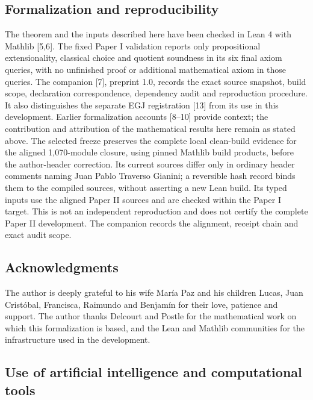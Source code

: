 \documentclass[english,11pt,a4paper]{article}
\begin{document}
\subsection{Formalization and reproducibility}\label{formalization-and-reproducibility}

The theorem and the inputs described here have been checked in Lean 4 with Mathlib {[}5,6{]}. The fixed Paper I validation reports only propositional extensionality, classical choice and quotient soundness in its six final axiom queries, with no unfinished proof or additional mathematical axiom in those queries. The companion {[}7{]}, preprint 1.0, records the exact source snapshot, build scope, declaration correspondence, dependency audit and reproduction procedure. It also distinguishes the separate EGJ registration {[}13{]} from its use in this development. Earlier formalization accounts {[}8--10{]} provide context; the contribution and attribution of the mathematical results here remain as stated above. The selected freeze preserves the complete local clean-build evidence for the aligned 1,070-module closure, using pinned Mathlib build products, before the author-header correction. Its current sources differ only in ordinary header comments naming Juan Pablo Traverso Gianini; a reversible hash record binds them to the compiled sources, without asserting a new Lean build. Its typed inputs use the aligned Paper II sources and are checked within the Paper I target. This is not an independent reproduction and does not certify the complete Paper II development. The companion records the alignment, receipt chain and exact audit scope.

\subsection{Acknowledgments}\label{acknowledgments}

The author is deeply grateful to his wife María Paz and his children Lucas, Juan Cristóbal, Francisca, Raimundo and Benjamín for their love, patience and support. The author thanks Delcourt and Postle for the mathematical work on which this formalization is based, and the Lean and Mathlib communities for the infrastructure used in the development.

\subsection{Use of artificial intelligence and computational tools}\label{use-of-artificial-intelligence-and-computational-tools}
\end{document}

